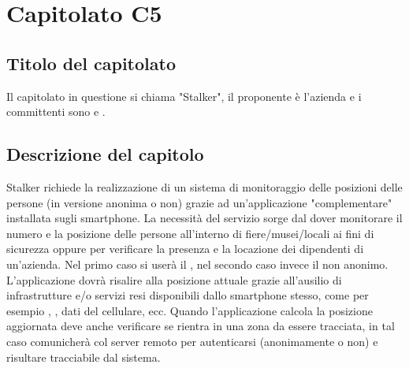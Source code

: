\section{Capitolato C5}
\subsection{Titolo del capitolato}
Il capitolato in questione si chiama "Stalker", il proponente è l'azienda \Proponente{} e i committenti sono \VT{} e \CR{}.

\subsection{Descrizione del capitolo}
Stalker richiede la realizzazione di un sistema di monitoraggio delle posizioni delle persone (in versione anonima o non) grazie ad un'applicazione "complementare" installata sugli smartphone. La necessità del servizio sorge dal dover monitorare il numero e la posizione delle persone all'interno di fiere/musei/locali ai fini di sicurezza oppure per verificare la presenza e la locazione dei dipendenti di un'azienda. Nel primo caso si user\`a il , nel secondo caso invece il  non anonimo. L'applicazione dovrà risalire alla posizione attuale grazie all'ausilio di infrastrutture e/o servizi resi disponibili dallo smartphone stesso, come per esempio , , dati del cellulare, ecc. Quando l'applicazione calcola la posizione aggiornata deve anche verificare se rientra in una zona da essere tracciata, in tal caso comunicherà col server remoto per autenticarsi (anonimamente o non) e risultare tracciabile dal sistema. 

